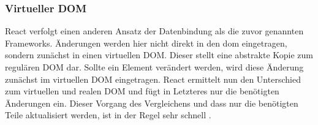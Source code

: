 \subsubsection{Virtueller DOM}
\label{sec:virtueller-dom}

React verfolgt einen anderen Ansatz der Datenbindung als die zuvor genannten Frameworks. Änderungen werden hier nicht direkt in den \ac{dom} eingetragen, sondern zunächst in einen virtuellen DOM. Dieser stellt eine abstrakte Kopie zum regulären DOM dar. Sollte ein Element verändert werden, wird diese Änderung zunächst im virtuellen DOM eingetragen. React ermittelt nun den Unterschied zum virtuellen und realen DOM und fügt in Letzteres nur die benötigten Änderungen ein. Dieser Vorgang des Vergleichens und dass nur die benötigten Teile aktualisiert werden, ist in der Regel sehr schnell \cite[S. 19]{Fedosejev2015}.